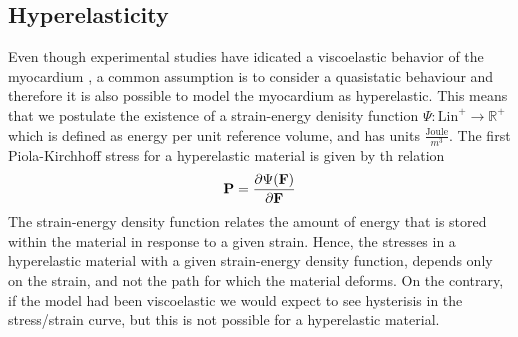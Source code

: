 \subsection{Hyperelasticity}
\label{sec:hyperelasticity}

Even though experimental studies have idicated a viscoelastic behavior
of the myocardium \cite{dokos2002shear, gultekin2016orthotropic}, a
common assumption is to consider a quasistatic behaviour and therefore
it is also possible to model the myocardium as hyperelastic.
This means that we postulate the existence of
a strain-energy denisity function $\Psi:\mathrm{Lin}^+ \rightarrow
\mathbb{R}^+$ which is defined as energy per unit reference volume,
and has units $\frac{\text{Joule}}{m^3}$. The first Piola-Kirchhoff
stress for a hyperelastic material is given by th relation
\begin{align}
\mathbf{P} = \frac{\partial \Psi(\mathbf{F})}{\partial \mathbf{F}}
\end{align}
The strain-energy density function relates  the amount of
energy that is stored within the material in response to a given
strain. Hence, the stresses in a hyperelastic material with a given
strain-energy density function, depends only on the strain, and not the
path for which the material deforms. On the contrary, if the model had
been viscoelastic we would expect to see hysterisis in the
stress/strain curve, but this is not possible for a hyperelastic
material. 

